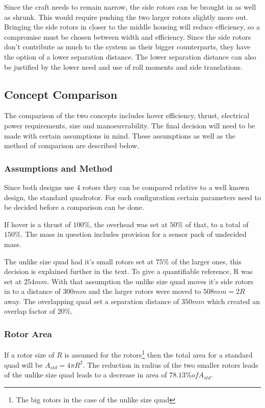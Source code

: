 			Since the craft needs to remain narrow, the side rotors can be brought in as well as shrunk. This would require pushing the two larger rotors slightly more out. Bringing the side rotors in closer to the middle housing will reduce efficiency, so a compromise must be chosen between width and efficiency. Since the side rotors don't contribute as much to the system as their bigger counterparts, they have the option of a lower separation distance. The lower separation distance can also be justified by the lower need and use of roll moments and side translations.
	
		\subsection{Concept Comparison}
		The comparison of the two concepts includes hover efficiency, thrust, electrical power requirements, size and manoeuvrability. The final decision will need to be made with certain assumptions in mind. These assumptions as well as the method of comparison are described below. 
	
			\subsubsection{Assumptions and Method}
			Since both designs use 4 rotors they can be compared relative to a well known design, the standard quadrotor. For each configuration certain parameters need to be decided before a comparison can be done. 
			
			If hover is a thrust of $100\%$, the overhead was set at $50\%$ of that, to a total of $150\%$. The mass in question includes provision for a sensor pack of undecided mass. 
			
			The unlike size quad had it's small rotors set at $75\%$ of the larger ones, this decision is explained further in the text. To give a quantifiable reference, R was set at $254mm$. With that assumption the unlike size quad moves it's side rotors in to a distance of $300mm$ and the larger rotors were moved to $508mm = 2R$ away. The overlapping quad set a separation distance of $350mm$ which created an overlap factor of $20\%$. 
	
			\subsubsection{Rotor Area}
			If a rotor size of $R$ is assumed for the rotors\footnote{The big rotors in the case of the unlike size quad} then the total area for a standard quad will be $A_{std} = 4 \pi R^2$. The reduction in radius of the two smaller rotors leads of the unlike size quad leads to a decrease in area of  $78.13\% of A_{std}$. 
			
